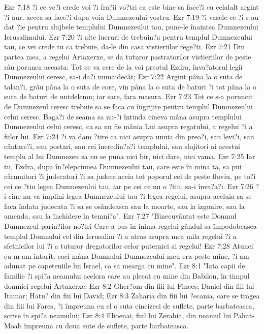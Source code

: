 Ezr 7:18  ?i ce ve?i crede voi ?i fra?ii vo?tri ca este bine sa face?i cu celalalt argint ?i aur, aceea sa face?i dupa voia Dumnezeului vostru.
Ezr 7:19  ?i vasele ce ?i s-au dat ?ie pentru slujbele templului Dumnezeului tau, pune-le înaintea Dumnezeului Ierusalimului.
Ezr 7:20  ?i alte lucruri de trebuin?a pentru templul Dumnezeului tau, ce vei crede tu ca trebuie, da-le din casa vistieriilor rege?ti.
Ezr 7:21  Din partea mea, a regelui Artaxerxe, se da tuturor pastratorilor vistieriilor de peste râu porunca aceasta: Tot ce va cere de la voi preotul Ezdra, înva?atorul legii Dumnezeului ceresc, sa-i da?i numaidecât;
Ezr 7:22  Argint pâna la o suta de talan?i, grâu pâna la o suta de core, vin pâna la o suta de baturi ?i tot pâna la o suta de baturi de untdelemn; iar sare, fara masura.
Ezr 7:23  Tot ce s-a poruncit de Dumnezeul ceresc trebuie sa se faca cu îngrijire pentru templul Dumnezeului celui ceresc. Baga?i de seama sa nu-?i întinda cineva mâna asupra templului Dumnezeului celui ceresc, ca sa nu fie mânia Lui asupra regatului, a regelui ?i a fiilor lui.
Ezr 7:24  ?i va dam ?tire ca nici asupra unuia din preo?i, sau levi?i, sau cântare?i, sau portari, sau cei încredin?a?i templului, sau slujitori ai acestui templu al lui Dumnezeu sa nu se puna nici bir, nici dare, nici vama.
Ezr 7:25  Iar tu, Ezdra, dupa în?elepciunea Dumnezeului tau, care este în mina ta, sa pui cârmuitori ?i judecatori ?i sa judece aceia tot poporul cel de peste fluviu, pe to?i cei ce ?tiu legea Dumnezeului tau, iar pe cei ce nu o ?tiu, sa-i înva?a?i.
Ezr 7:26  ?i cine nu va împlini legea Dumnezeului tau ?i legea regelui, asupra aceluia sa se faca îndata judecata ?i sa se osândeasca sau la moarte, sau la izgonire, sau la amenda, sau la închidere în temni?a".
Ezr 7:27  "Binecuvântat este Domnul Dumnezeul parin?ilor no?tri Care a pus în inima regelui gândul sa împodobeasca templul Domnului cel din Ierusalim ?i a atras asupra mea mila regelui ?i a sfetnicilor lui ?i a tuturor dregatorilor celor puternici ai regelui!
Ezr 7:28  Atunci eu m-am întarit, caci mâna Domnului Dumnezeului meu era peste mine, ?i am adunat pe capeteniile lui Israel, ca sa mearga cu mine".
Ezr 8:1  "Iata capii de familie ?i spi?a neamului acelora care au plecat cu mine din Babilon, în timpul domniei regelui Artaxerxe:
Ezr 8:2  Gher?om din fiii lui Finees; Daniel din fiii lui Itamar; Hatu? din fiii lui David;
Ezr 8:3  Zaharia din fiii lui ?ecania, care se tragea din fiii lui Fares, ?i împreuna cu el o suta cincizeci de suflete, parte barbateasca, scrise în spi?a neamului;
Ezr 8:4  Elioenai, fiul lui Zerahia, din neamul lui Pahat-Moab împreuna cu doua sute de suflete, parte barbateasca.
